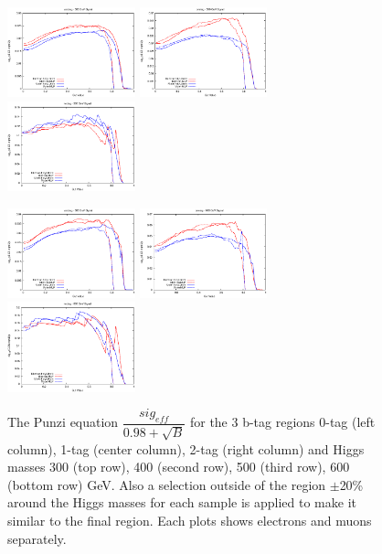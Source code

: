 \begin{figure}[htb!]
\begin{center}
{}
\centerline{
  \includegraphics[width=0.33\textwidth]{Optimization/5ang/zero_500.eps}
\includegraphics[width=0.33\textwidth]{Optimization/5ang/one_500.eps}
\includegraphics[width=0.33\textwidth]{Optimization/5ang/two_500.eps}
}
\centerline{
  \includegraphics[width=0.33\textwidth]{Optimization/5ang/zero_600.eps}
 \includegraphics[width=0.33\textwidth]{Optimization/5ang/one_600.eps}
 \includegraphics[width=0.33\textwidth]{Optimization/5ang/two_600.eps}
}
\caption{
The Punzi equation $\dfrac{sig_{eff}}{0.98 + \sqrt{B}}$ for the 3 b-tag regions 0-tag (left column), 1-tag (center column), 2-tag (right column) and Higgs masses 300 (top row), 400 (second row), 500 (third row), 600 (bottom row) GeV.  Also a selection outside of the region $\pm$20\% around the Higgs masses for each sample is applied to make it similar to the final region. Each plots shows electrons and muons separately.
}
\label{fig:Punzi_tags}
\end{center}
\end{figure}




